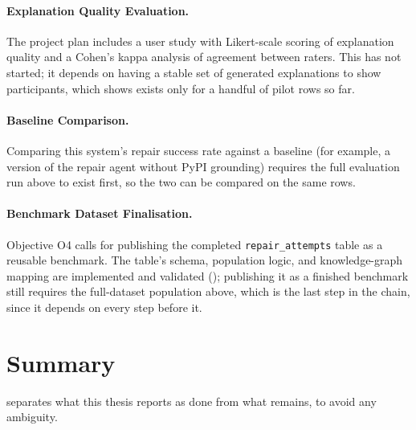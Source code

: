 \paragraph{Explanation Quality Evaluation.} The project plan includes a
user study with Likert-scale scoring of explanation quality and a Cohen's
kappa analysis of agreement between raters. This has not started; it
depends on having a stable set of generated explanations to show
participants, which  shows exists only for a handful
of pilot rows so far.

\paragraph{Baseline Comparison.} Comparing this system's repair success
rate against a baseline (for example, a version of the repair agent without
PyPI grounding) requires the full evaluation run above to exist first, so
the two can be compared on the same rows.

\paragraph{Benchmark Dataset Finalisation.} Objective O4 calls for
publishing the completed \texttt{repair\_attempts} table as a reusable
benchmark. The table's schema, population logic, and knowledge-graph
mapping are implemented and validated ();
publishing it as a finished benchmark still requires the full-dataset
population above, which is the last step in the chain, since it depends on
every step before it.

\section{Summary}

 separates what this thesis reports as done from
what remains, to avoid any ambiguity.

